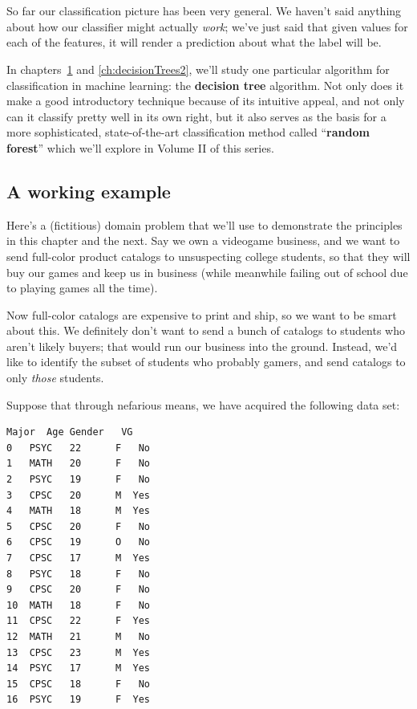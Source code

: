 
\chapter[Decision trees for classification (1 of 2)]{\huge\selectfont{Decision
trees for classification (1 of 2)}}
\label{ch:decisionTrees1}

So far our classification picture has been very general. We haven't said
anything about how our classifier might actually \textit{work}; we've just said
that given values for each of the features, it will render a prediction about
what the label will be.


In chapters~\ref{ch:decisionTrees1} and \ref{ch:decisionTrees2}, we'll study
one particular algorithm for classification in machine learning: the
\textbf{decision tree} algorithm. Not only does it make a good introductory
technique because of its intuitive appeal, and not only can it classify pretty
well in its own right, but it also serves as the basis for a more
sophisticated, state-of-the-art classification method called ``\textbf{random
forest}'' which we'll explore in Volume II of this series.

\section{A working example}

 

Here's a (fictitious) domain problem that
we'll use to demonstrate the principles in this chapter and the next. Say we
own a videogame business, and we want to send full-color product catalogs to
unsuspecting college students, so that they will buy our games and keep us in
business (while meanwhile failing out of school due to playing games all the
time).

Now full-color catalogs are expensive to print and ship, so we want to be smart
about this. We definitely don't want to send a bunch of catalogs to students
who aren't likely buyers; that would run our business into the ground. Instead,
we'd like to identify the subset of students who probably gamers, and send
catalogs to only \textit{those} students.

Suppose that through nefarious means, we have acquired the following data set:

\begin{Verbatim}[fontsize=\small,samepage=true,frame=single,framesep=3mm,xleftmargin=4.3cm,xrightmargin=4.2cm]
   Major  Age Gender   VG
0   PSYC   22      F   No
1   MATH   20      F   No
2   PSYC   19      F   No
3   CPSC   20      M  Yes
4   MATH   18      M  Yes
5   CPSC   20      F   No
6   CPSC   19      O   No
7   CPSC   17      M  Yes
8   PSYC   18      F   No
9   CPSC   20      F   No
10  MATH   18      F   No
11  CPSC   22      F  Yes
12  MATH   21      M   No
13  CPSC   23      M  Yes
14  PSYC   17      M  Yes
15  CPSC   18      F   No
16  PSYC   19      F  Yes
\end{Verbatim}

